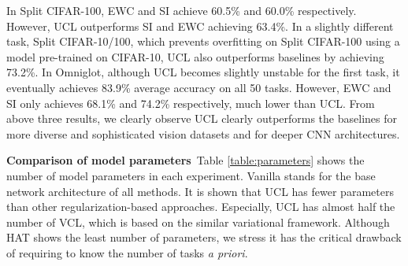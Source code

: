In Split CIFAR-100, EWC and SI achieve 60.5\% and 60.0\% respectively. However, UCL outperforms SI and EWC achieving 63.4\%. In a slightly different task, Split CIFAR-10/100, which prevents overfitting on Split CIFAR-100 using a model pre-trained on CIFAR-10, UCL also outperforms baselines by achieving 73.2\%. In Omniglot, although UCL becomes slightly unstable for the first task, it eventually achieves 83.9\% average accuracy on all 50 tasks. However, EWC and SI only achieves 68.1\% and 74.2\% respectively, much lower than UCL. From above three results, we clearly observe UCL clearly outperforms the baselines for more diverse and sophisticated vision datasets and for deeper CNN architectures. 


\vspace{-.05in}


\begin{table}[th]
\small
\centering
\caption{The number of parameters used for each benchmark.
}\vspace{-.05in}\label{table:parameters}
\end{table}

\textbf{Comparison of model parameters}\ 
Table \ref{table:parameters} shows the number of model parameters in each experiment. Vanilla stands for the base network architecture of all methods. It is shown that UCL has fewer parameters than other regularization-based approaches. Especially, UCL has almost half the number of VCL, which is based on the similar variational framework. 
Although HAT shows the least number of parameters, we stress it has the critical drawback of requiring to know the number of tasks \emph{a priori}. 










